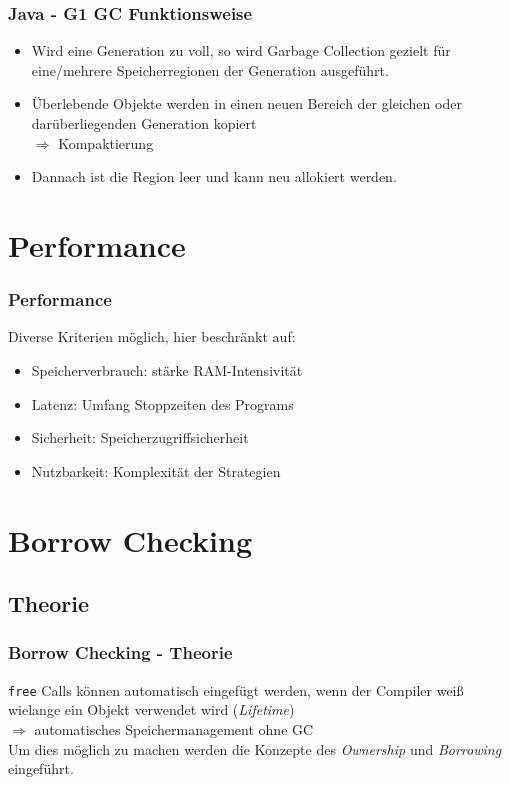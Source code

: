 \documentclass{beamer}
\begin{document}
            \begin{frame}
                \frametitle{Java - G1 GC Funktionsweise}

                \begin{itemize}
                    \item Wird eine Generation zu voll, so wird Garbage Collection gezielt für eine/mehrere Speicherregionen der Generation ausgeführt.
                    \item Überlebende Objekte werden in einen neuen Bereich der gleichen oder darüberliegenden Generation kopiert
                        \\$\Rightarrow$ Kompaktierung
                    \item Dannach ist die Region leer und kann neu allokiert werden.
                \end{itemize}
            \end{frame}

    \section{Performance}
        \begin{frame}
            \frametitle{Performance}

            Diverse Kriterien möglich, hier beschränkt auf:

            \begin{itemize}
                \item Speicherverbrauch: stärke RAM-Intensivität
                \item Latenz: Umfang Stoppzeiten des Programs
                \item Sicherheit: Speicherzugriffsicherheit
                \item Nutzbarkeit: Komplexität der Strategien
            \end{itemize}
        \end{frame}
        
    \section{Borrow Checking}

        \subsection{Theorie}
        \begin{frame}
            \frametitle{Borrow Checking - Theorie}

            \texttt{free} Calls können automatisch eingefügt werden, wenn der Compiler weiß wielange ein Objekt verwendet wird (\textit{Lifetime})\\
            $\Rightarrow$ automatisches Speichermanagement ohne GC\\
            Um dies möglich zu machen werden die Konzepte des \textit{Ownership} und \textit{Borrowing} eingeführt.
        \end{frame}
\end{document}
